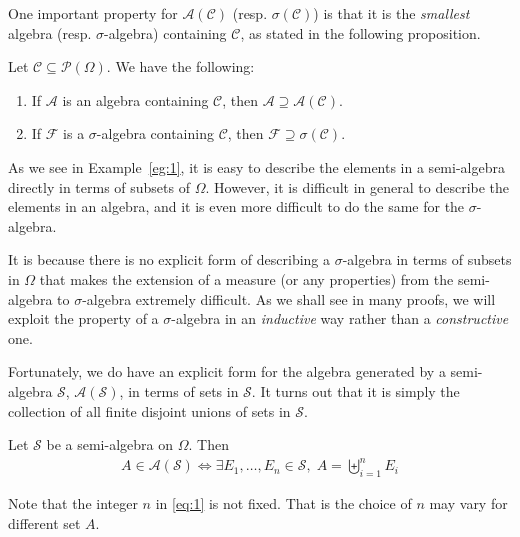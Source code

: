 \documentclass[thmcnt=section, 12pt, color=purple]{my-elegantbook}
\begin{document}
One important property for $\mathcal{A}(\mathcal{C})$ 
(resp. $\sigma(\mathcal{C})$) is that 
it is the \textit{smallest} algebra (resp. $\sigma$-algebra) 
containing $\mathcal{C}$, as stated in the following proposition.

\begin{proposition} \label{pro:3}
	Let $\mathcal{C} \subseteq \mathcal{P}(\Omega)$.
	We have the following:
	\begin{enumerate}
		\item If $\mathcal{A}$ is an algebra containing $\mathcal{C}$,
			then $\mathcal{A} \supseteq \mathcal{A}(\mathcal{C})$.
		\item If $\mathcal{F}$ is a $\sigma$-algebra containing $\mathcal{C}$,
			then $\mathcal{F} \supseteq \sigma(\mathcal{C})$.
	\end{enumerate}
\end{proposition}


As we see in Example~\ref{eg:1},
it is easy to describe the elements in a semi-algebra
directly in terms of subsets of $\Omega$.
However, it is difficult in general to describe 
the elements in an algebra,
and it is even more difficult to do the same 
for the $\sigma$-algebra.

It is because there is no explicit form of
describing a $\sigma$-algebra in terms of subsets in $\Omega$
that makes the extension of a measure (or any properties) from 
the semi-algebra to $\sigma$-algebra extremely difficult.
As we shall see in many proofs, 
we will exploit the property of a $\sigma$-algebra
in an \textit{inductive} way rather than a \textit{constructive} one.

Fortunately, we do have an explicit form for the algebra generated
by a semi-algebra $\mathcal{S}$, $\mathcal{A}(\mathcal{S})$,
in terms of sets in $\mathcal{S}$.
It turns out that it is simply the collection
of all finite disjoint unions of sets in $\mathcal{S}$.

\begin{theorem} \label{thm:2}
	Let $\mathcal{S}$ be a semi-algebra on $\Omega$.
	Then
	\begin{align}
		A \in \mathcal{A}(\mathcal{S})
		\iff \exists E_1, \ldots, E_n \in \mathcal{S}, \;
		A = \biguplus_{i=1}^n E_i
		\label{eq:1}
	\end{align}
\end{theorem}

\begin{note}
	Note that the integer $n$ in \eqref{eq:1} is not fixed.
	That is the choice of $n$ may vary for different set $A$.
\end{note}
\end{document}
